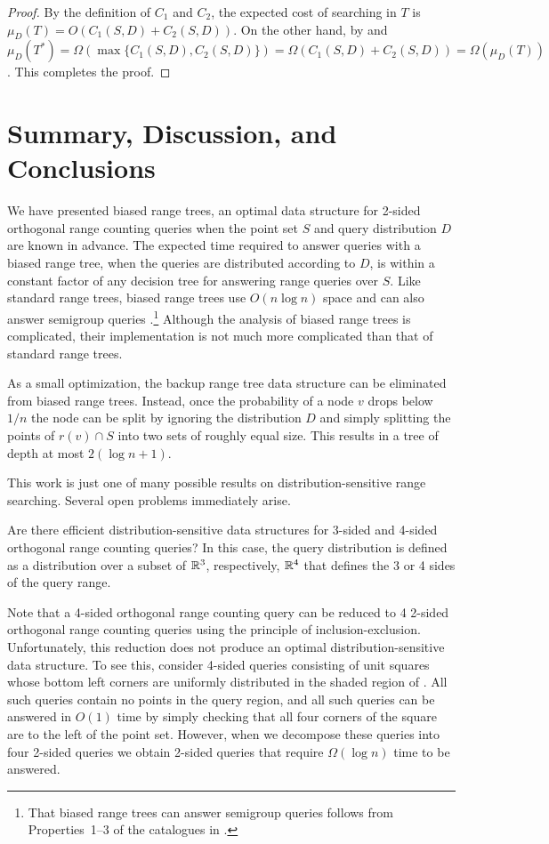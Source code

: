 \documentclass{patmorin}
\begin{document}
\begin{proof}
By the definition of $C_1$ and $C_2$, the expected cost of searching in
$T$ is $\mu_D(T)=O(C_1(S,D)+C_2(S,D))$.  On the other hand, by
 and  $\mu_D(T^*) =
\Omega(\max\{C_1(S,D),C_2(S,D)\}) =
\Omega(C_1(S,D)+C_2(S,D))=\Omega(\mu_D(T))$.  This completes the proof.
\end{proof}

\section{Summary, Discussion, and Conclusions}

We have presented biased range trees, an optimal data structure for
2-sided orthogonal range counting queries when the point set $S$ and
query distribution $D$ are known in advance. The expected time required
to answer queries with a biased range tree, when the queries are
distributed according to $D$, is within a constant factor of any
decision tree for answering range queries over $S$.  Like standard
range trees, biased range trees use $O(n\log n)$ space and can also
answer semigroup queries \cite{ae133,ae292}.\footnote{That biased
range trees can answer semigroup queries follows
from Properties~1--3 of the catalogues in .}
Although the analysis of
biased range trees is complicated, their implementation is not much
more complicated than that of standard range trees.

As a small optimization, the backup range tree data structure can be
eliminated from biased range trees.  Instead, once the probability of
a node $v$ drops below $1/n$ the node can be split by ignoring the
distribution $D$ and simply splitting the points of $r(v)\cap S$ into
two sets of roughly equal size.  This results in a tree of depth at
most $2(\log n+1)$.

This work is just one of many possible results on
distribution-sensitive range searching.  Several open problems
immediately arise.  

\begin{op}
Are there efficient distribution-sensitive data structures for 3-sided
and 4-sided orthogonal range counting queries?  In this case, the query
distribution is defined as a distribution over a subset of $\mathbb{R}^3$,
respectively, $\mathbb{R}^4$ that defines the 3 or 4 sides of the query range.
\end{op}

Note that a 4-sided orthogonal range counting query can be reduced to 4
2-sided orthogonal range counting queries using the principle of
inclusion-exclusion.  Unfortunately, this reduction does not produce an
optimal distribution-sensitive data structure.  To see this, consider
4-sided queries consisting of unit squares whose bottom left corners are
uniformly distributed in the shaded region of .  All such
queries contain no points in the query region, and all such queries can be
answered in $O(1)$ time by simply checking that all four corners of the
square are to the left of the point set.  However, when we decompose these
queries into four 2-sided queries we obtain 2-sided queries that require
$\Omega(\log n)$ time to be answered.
\end{document}
